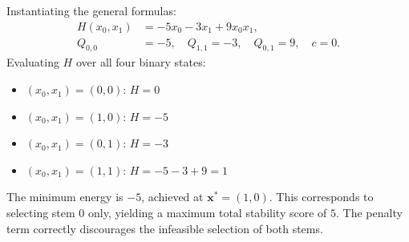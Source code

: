 \documentclass[12pt]{article}
\begin{document}
Instantiating the general formulas:
\begin{align}
  H(x_0, x_1) &= -5x_0 - 3x_1 + 9x_0 x_1, \\
  Q_{0,0} &= -5, \quad Q_{1,1} = -3, \quad Q_{0,1} = 9, \quad c = 0.
\end{align}
Evaluating $H$ over all four binary states:
\begin{itemize}
  \item $(x_0, x_1) = (0,0)$: $H = 0$
  \item $(x_0, x_1) = (1,0)$: $H = -5$
  \item $(x_0, x_1) = (0,1)$: $H = -3$
  \item $(x_0, x_1) = (1,1)$: $H = -5 - 3 + 9 = 1$
\end{itemize}
The minimum energy is $-5$, achieved at $\mathbf{x}^* = (1,0)$. This corresponds to selecting stem $0$ only, yielding a maximum total stability score of $5$. The penalty term correctly discourages the infeasible selection of both stems.
\end{document}
